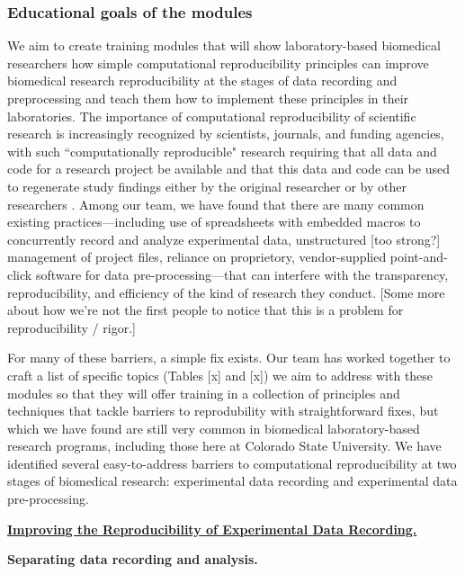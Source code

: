 \documentclass[pdftex,english,11pt,parskip=half]{scrartcl}
\begin{document}
\subsubsection*{Educational goals of the modules}

We aim to create training modules that will show laboratory-based biomedical researchers how simple computational reproducibility principles can improve biomedical research reproducibility at the stages of data recording and preprocessing and teach them how to implement these principles in their laboratories. The importance of computational reproducibility of scientific research is increasingly recognized by scientists, journals, and funding agencies, with such ``computationally reproducible" research requiring that all data and code for a research project be available and that this data and code can be used to regenerate study findings either by the original researcher or by other researchers \cite{ellis2017share, ram2013git}. Among our team, we have found that there are many common existing practices---including use of spreadsheets with embedded macros to concurrently record and analyze experimental data, unstructured [too strong?] management of project files, reliance on proprietory, vendor-supplied point-and-click software for data pre-processing---that can interfere with the transparency, reproducibility, and efficiency of the kind of research they conduct. [Some more about how we're not the first people to notice that this is a problem for reproducibility / rigor.] 

For many of these barriers, a simple fix exists. Our team has worked together to craft a list of specific topics (Tables [x] and [x]) we aim to address with these modules so that they will offer training in a collection of principles and techniques that tackle barriers to reprodubility with straightforward fixes, but which we have found are still very common in biomedical laboratory-based research programs, including those here at Colorado State University. We have identified several easy-to-address barriers to computational reproducibility at two stages of biomedical research: experimental data recording and experimental data pre-processing.  

\underline{\textbf{Improving the Reproducibility of Experimental Data Recording.}} 

\textbf{Separating data recording and analysis.}
\end{document}
